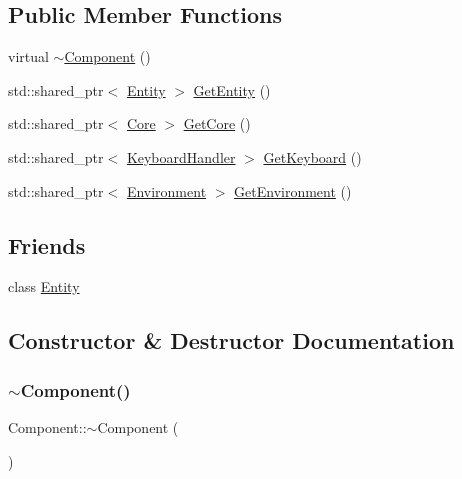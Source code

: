 \subsection*{Public Member Functions}
\begin{DoxyCompactItemize}
\item 
virtual \mbox{\hyperlink{class_component_ab8378fa275af98e568a7e91d33d867af}{$\sim$\+Component}} ()
\item 
std\+::shared\+\_\+ptr$<$ \mbox{\hyperlink{class_entity}{Entity}} $>$ \mbox{\hyperlink{class_component_a746298ddfd39da5b191926aa8d8f6d95}{Get\+Entity}} ()
\item 
std\+::shared\+\_\+ptr$<$ \mbox{\hyperlink{class_core}{Core}} $>$ \mbox{\hyperlink{class_component_a601ec93559ca1dd75c2c1ea13510594d}{Get\+Core}} ()
\item 
std\+::shared\+\_\+ptr$<$ \mbox{\hyperlink{class_keyboard_handler}{Keyboard\+Handler}} $>$ \mbox{\hyperlink{class_component_a1639a645d23caae1be3b952b850a65c4}{Get\+Keyboard}} ()
\item 
std\+::shared\+\_\+ptr$<$ \mbox{\hyperlink{class_environment}{Environment}} $>$ \mbox{\hyperlink{class_component_acc728e71f991a200996b9215b4b4739a}{Get\+Environment}} ()
\end{DoxyCompactItemize}
\subsection*{Friends}
\begin{DoxyCompactItemize}
\item 
class \mbox{\hyperlink{class_component_a614439ccac0344926adc4c0165d64060}{Entity}}
\end{DoxyCompactItemize}


\subsection{Constructor \& Destructor Documentation}
\mbox{\label{class_component_ab8378fa275af98e568a7e91d33d867af}} 
\subsubsection{\texorpdfstring{$\sim$\+Component()}{~Component()}}
{\footnotesize\ttfamily Component\+::$\sim$\+Component (\begin{DoxyParamCaption}{ }\end{DoxyParamCaption})\hspace{0.3cm}{\ttfamily [virtual]}}




